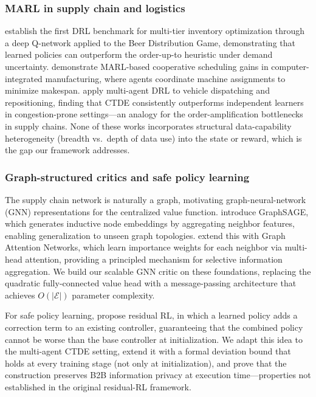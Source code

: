 \documentclass[11pt,a4paper]{article}
\theoremstyle{plain}
\theoremstyle{definition}
\begin{document}
\subsubsection*{MARL in supply chain and logistics}

\citet{oroojlooyjadid2022deep} establish the first DRL benchmark for multi-tier inventory
optimization through a deep Q-network applied to the Beer Distribution Game, demonstrating
that learned policies can outperform the order-up-to heuristic under demand uncertainty.
\citet{zhang2020multi} demonstrate MARL-based cooperative scheduling gains in
computer-integrated manufacturing, where agents coordinate machine assignments to minimize
makespan.  \citet{holler2019deep} apply multi-agent DRL to vehicle dispatching and
repositioning, finding that CTDE consistently outperforms independent learners in
congestion-prone settings---an analogy for the order-amplification bottlenecks in supply
chains.  None of these works incorporates structural data-capability heterogeneity (breadth
vs.\ depth of data use) into the state or reward, which is the gap our framework addresses.

\subsubsection*{Graph-structured critics and safe policy learning}

The supply chain network is naturally a graph, motivating graph-neural-network (GNN)
representations for the centralized value function.  \citet{hamilton2017inductive}
introduce GraphSAGE, which generates inductive node embeddings by aggregating neighbor
features, enabling generalization to unseen graph topologies.  \citet{velic2018graph}
extend this with Graph Attention Networks, which learn importance weights for each
neighbor via multi-head attention, providing a principled mechanism for selective
information aggregation.  We build our scalable GNN critic on these foundations,
replacing the quadratic fully-connected value head with a message-passing architecture
that achieves $O(|\mathcal{E}|)$ parameter complexity.

For safe policy learning, \citet{silver2018residual} propose residual RL, in which a
learned policy adds a correction term to an existing controller, guaranteeing that the
combined policy cannot be worse than the base controller at initialization.  We adapt
this idea to the multi-agent CTDE setting, extend it with a formal deviation bound
that holds at every training stage (not only at initialization), and prove that the
construction preserves B2B information privacy at execution time---properties not
established in the original residual-RL framework.
\end{document}
